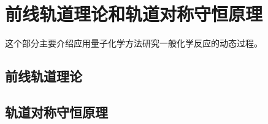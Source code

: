 
\section{前线轨道理论和轨道对称守恒原理}

这个部分主要介绍应用量子化学方法研究一般化学反应的动态过程。

\subsection{前线轨道理论}


\subsection{轨道对称守恒原理}

